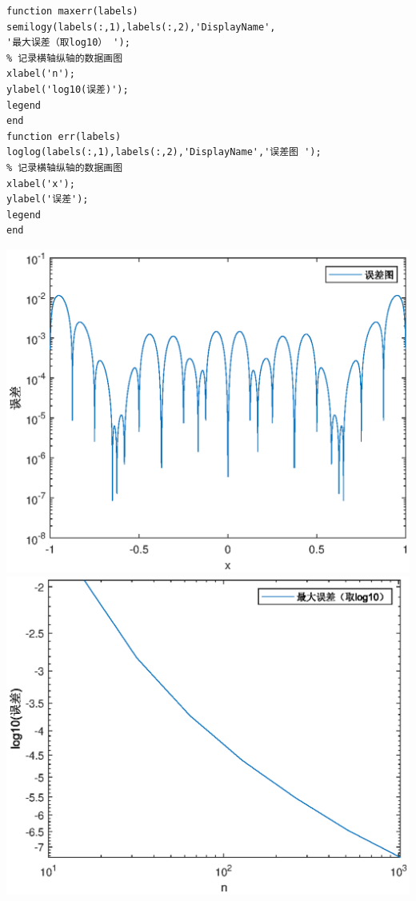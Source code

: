 \documentclass[12pt,a4paper,UTF8]{ctexart}
\begin{document}
\begin{enumerate}
\begin{lstlisting}[frame=single]
function maxerr(labels)
semilogy(labels(:,1),labels(:,2),'DisplayName',
'最大误差（取log10） ');
% 记录横轴纵轴的数据画图
xlabel('n');
ylabel('log10(误差)');
legend
end
function err(labels)
loglog(labels(:,1),labels(:,2),'DisplayName','误差图 ');
% 记录横轴纵轴的数据画图
xlabel('x');
ylabel('误差');
legend
end
\end{lstlisting}
\begin{center}
\includegraphics[scale=1]{1db.eps}\\
\includegraphics[scale=1]{1dc.eps}\\
\end{center}




\end{enumerate}
\end{document}
